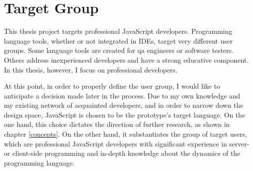 \section{Target Group}\label{target-group}

This thesis project targets professional JavaScript developers.
Programming language tools, whether or not integrated in IDEs, target
very different user groups. Some language tools are created for \ac{qa}
engineers or software testers. Others address inexperienced developers
and have a strong educative component. In this thesis, however, I focus
on professional developers.

At this point, in order to properly define the user group, I would like
to anticipate a decision made later in the process. Due to my own
knowledge and my existing network of acquainted developers, and in order
to narrow down the design space, JavaScript is chosen to be the
prototype’s target language. On the one hand, this choice dictates the
direction of further research, as shown in chapter \ref{concepts}. On
the other hand, it substantiates the group of target users, which are
professional JavaScript developers with significant experience in
server- or client-side programming and in-depth knowledge about the
dynamics of the programming language.

